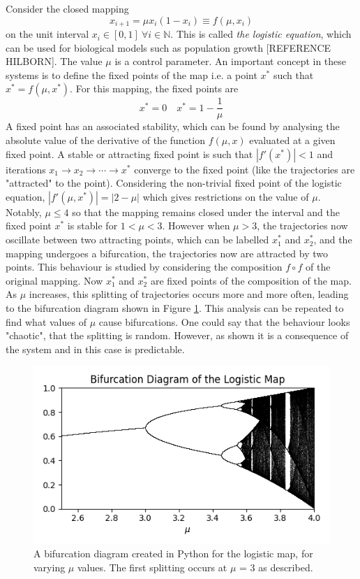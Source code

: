 \documentclass[12pt,a4paper]{amsart}
\begin{document}
Consider the closed mapping $$x_{i+1} = {\mu} x_{i} (1 - x_{i}) \equiv f(\mu, x_{i}) \label{mapping}$$ on the unit interval $x_{i} \in [0, 1] \  {\forall}i \in \mathbb{N}$. This is called \textit{the logistic equation}, which can be used for biological models such as population growth [REFERENCE HILBORN]. The value $\mu$ is a control parameter. An important concept in these systems is to define the fixed points of the map i.e. a point $x^{*}$ such that $x^{*} = f(\mu, x^{*})$. For this mapping, the fixed points are $$x^{*} = 0 \quad x^{*} = 1 - \frac{1}{\mu}$$ A fixed point has an associated stability, which can be found by analysing the absolute value of the derivative of the function $f(\mu, x)$ evaluated at a given fixed point. A stable or attracting fixed point is such that $|f'(x^{*})| < 1$ and iterations $x_{1} \rightarrow x_{2} \rightarrow \cdots \rightarrow x^{*}$ converge to the fixed point (like the trajectories are "attracted" to the point). Considering the non-trivial fixed point of the logistic equation, $|f'(\mu, x^{*})| = |2 - \mu|$ which gives restrictions on the value of $\mu$. Notably, $\mu \leq 4$ so that the mapping remains closed under the interval and the fixed point $x^{*}$ is stable for $1 < \mu < 3$. However when $\mu > 3$, the trajectories now oscillate between two attracting points, which can be labelled $x_{1}^{*}$ and $x_{2}^{*}$, and the mapping undergoes a bifurcation, the trajectories now are attracted by two points. This behaviour is studied by considering the composition $f \circ f$ of the original mapping. Now $x_{1}^{*}$ and $x_{2}^{*}$ are fixed points of the composition of the map. As $\mu$ increases, this splitting of trajectories occurs more and more often, leading to the bifurcation diagram shown in Figure \ref{fig:bif}. This analysis can be repeated to find what values of $\mu$ cause bifurcations. One could say that the behaviour looks "chaotic", that the splitting is random. However, as shown it is a consequence of the system and in this case is predictable.

\begin{figure}[h] 
    \centering
    \includegraphics[scale=0.8]{logistic_map_bifur.png}
    \caption{A bifurcation diagram created in Python for the logistic map, for varying $\mu$ values. The first splitting occurs at $\mu$ = 3 as described.}
    \label{fig:bif}
\end{figure}
\end{document}

